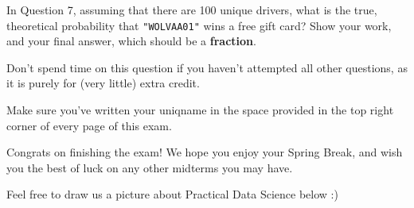 \documentclass[twoside,12pt]{article}
\begin{document}
\begin{probset}
\begin{prob}[(6 pts)]
\begin{subprobset}





\end{subprobset}

\end{prob}

\newpage

\begin{prob}

In Question 7, assuming that there are 100 unique drivers, what is the true, theoretical probability that \texttt{"WOLVAA01"} wins a free gift card? Show your work, and  your final answer, which should be a \textbf{fraction}.

Don't spend time on this question if you haven't attempted all other questions, as it is purely for (very little) extra credit.

\begin{responsebox}{3in}
    
\end{responsebox}

\end{prob}

\newpage

Make sure you've written your uniqname in the space provided in the top right corner of every page of this exam.

Congrats on finishing the exam! We hope you enjoy your Spring Break, and wish you the best of luck on any other midterms you may have.

Feel free to draw us a picture about Practical Data Science below :)


\begin{responsebox}{7in}
    
\end{responsebox}

\end{probset}
\end{document}
